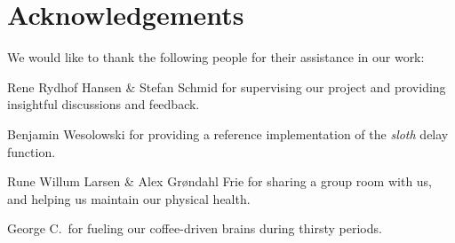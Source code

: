 \section{Acknowledgements}
We would like to thank the following people for their assistance in our work:


Rene Rydhof Hansen \& Stefan Schmid for supervising our project and providing insightful discussions and feedback.

Benjamin Wesolowski for providing a reference implementation of the \emph{sloth} delay function.

Rune Willum Larsen \& Alex Grøndahl Frie for sharing a group room with us, and helping us maintain our physical health.

George C.\ for fueling our coffee-driven brains during thirsty periods.

